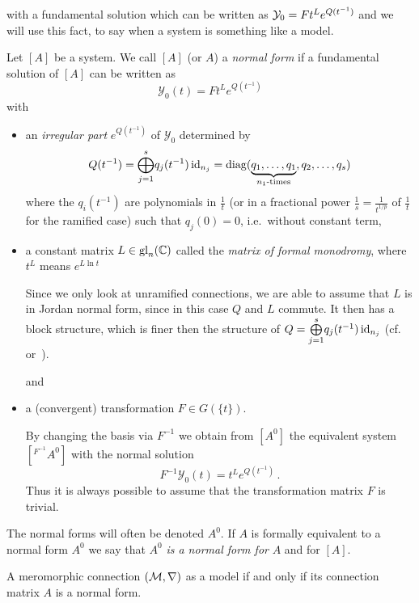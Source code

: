 with a fundamental solution which can be written as $\mathcal{Y}_0=Ft^Le^{Q(t^{-1})}$
and we will use this fact, to say when a system is something like a model.
\begin{defn}\label{defn:normSol}
  Let $[A]$ be a system.
  We call $[A]$ (or $A$) a \emph{normal form} if a fundamental solution of
  $[A]$ can be written as
  \[
    \mathcal{Y}_0(t)=F t^L e^{Q(t^{-1})}
  \]
  with
  \begin{itemize}
    \item an \emph{irregular part} $e^{Q(t^{-1})}$ of $\mathcal{Y}_0$
      determined by
      \[
        Q(t^{-1})=\underset{j=1}{\overset{s}{\bigoplus}}q_j(t^{-1})\id_{n_j}
          =\diag(\underset{n_1\text{-times}}{\underbrace{%
          q_1,\dots,q_1}},q_2,\dots,q_s)
      \]
      where the $q_i(t^{-1})$ are polynomials in $\frac{1}{t}$ (or in a
      fractional power $\frac{1}{s}=\frac{1}{t^{1/p}}$ of $\frac{1}{t}$ for the
      ramified case) such that $q_j(0)=0$, i.e.\ without constant term,
    \item a constant matrix $L\in\operatorname{gl}_n(\mathbb{C})$ called the \emph{matrix of formal
      monodromy}, where $t^L$ means $e^{L\ln t}$
        \begin{s-rem}
          Since we only look at unramified connections, we are able to assume
          that $L$ is in Jordan normal form, since in this case $Q$ and $L$
          commute. It then has a block structure, which is finer then the
          structure of
          $Q=\underset{j=1}{\overset{s}{\bigoplus}}q_j(t^{-1})\operatorname{id}_{n_j}$
          (cf.~\cite[Sec.1]{Remy2014} or~\cite[Sec.4]{Martinet1991}).
          \PROBLEM[Why?]
        \end{s-rem}
      and
    \item a (convergent) transformation $F\in G(\!\{t\}\!)$.
      \begin{s-rem}
        By changing the basis via $F^{-1}$ we obtain from $[A^0]$ the
        equivalent system $[{}^{F^{-1}}\!A^0]$ with the normal solution
        \[
          F^{-1}\mathcal{Y}_0(t)=t^L e^{Q(t^{-1})} \,.
        \]
        Thus it is always possible to assume that the transformation matrix $F$
        is trivial.
      \end{s-rem}
  \end{itemize}
  The normal forms will often be denoted $A^0$.
  If $A$ is formally equivalent to a normal form $A^0$ we say that $A^0$
  \emph{is a normal form for} $A$ and for $[A]$.
\end{defn}
\begin{cor}
  A meromorphic connection $(\mathcal{M},\nabla)$ as a model if and only if its
  connection matrix $A$ is a normal form.
\end{cor}

